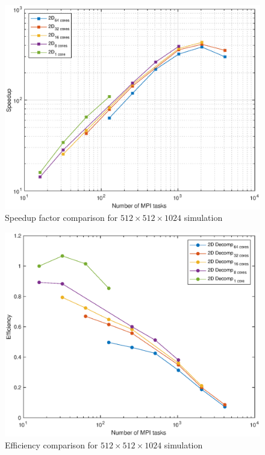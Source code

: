 \begin{figure}
\begin{center}
\includegraphics[scale=0.55]{grafici/5125}
\caption{Speedup factor comparison for $512\times 512\times 1024$ simulation}
\label{512:perf}
\end{center}
\end{figure}

\begin{figure}
\begin{center}
\includegraphics[scale=0.55]{grafici/5126}
\caption{Efficiency comparison for $512\times 512\times 1024$ simulation}
\label{512:eff}
\end{center}
\end{figure}